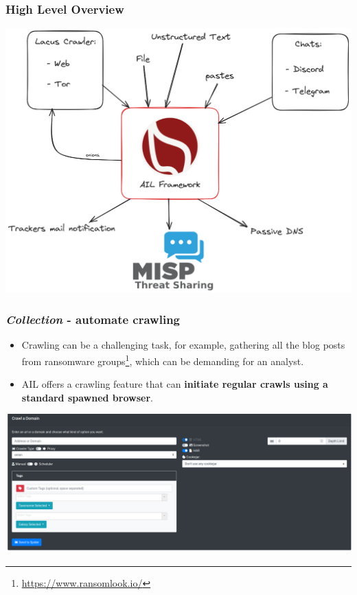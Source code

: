 \documentclass[10pt,aspectratio=169, colorlinks=true, linkcolor=circlBlue]{beamer}
\begin{document}

\begin{frame}
    \frametitle{High Level Overview}
    \begin{center}
        \includegraphics[scale=0.24]{images/ail-overview.png}
    \end{center}
\end{frame}

\begin{frame}
    \frametitle{{\it Collection} - automate crawling}

\begin{itemize}
    \item Crawling can be a challenging task, for example, gathering all the blog posts from ransomware groups\footnote{\url{https://www.ransomlook.io/}}, which can be demanding for an analyst.
    \item AIL offers a crawling feature that can {\bf initiate regular crawls using a standard spawned browser}.
\end{itemize}
    \begin{center}
        \includegraphics[scale=0.17]{images/ail-crawling.png}
    \end{center}
\end{frame}
\end{document}
